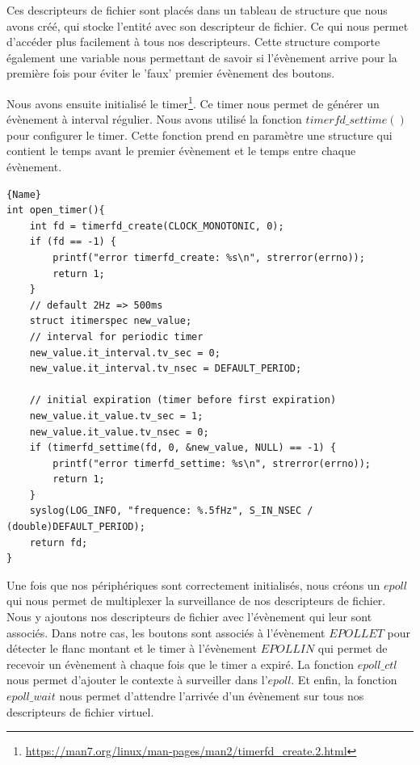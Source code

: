 \documentclass[
	a4paper, %
	10pt, %
]{CSUniSchoolLabReport}
\begin{document}
Ces descripteurs de fichier sont placés dans un tableau de structure que nous avons créé, qui stocke l'entité avec son descripteur de fichier. Ce qui nous permet d'accéder plus facilement à tous nos descripteurs. Cette structure comporte également une variable nous permettant de savoir si l'évènement arrive pour la première fois pour éviter le 'faux' premier évènement des boutons.

Nous avons ensuite initialisé le timer\footnote{\href{https://man7.org/linux/man-pages/man2/timerfd_create.2.html}{https://man7.org/linux/man-pages/man2/timerfd\_create.2.html}}. 
Ce timer nous permet de générer un évènement à interval régulier. Nous avons utilisé la fonction $timerfd\_settime()$ pour configurer le timer. Cette fonction prend en paramètre une structure qui contient le temps avant le premier évènement et le temps entre chaque évènement.
\newpage
\begin{lstlisting}[style=CStyle, caption=Initialisation du timer, firstnumber=1]{Name}
int open_timer(){
	int fd = timerfd_create(CLOCK_MONOTONIC, 0);
    if (fd == -1) {
        printf("error timerfd_create: %s\n", strerror(errno));
        return 1;
    }
    // default 2Hz => 500ms
    struct itimerspec new_value;
    // interval for periodic timer
    new_value.it_interval.tv_sec = 0;
    new_value.it_interval.tv_nsec = DEFAULT_PERIOD; 

    // initial expiration (timer before first expiration)
    new_value.it_value.tv_sec = 1;
    new_value.it_value.tv_nsec = 0;
    if (timerfd_settime(fd, 0, &new_value, NULL) == -1) {
        printf("error timerfd_settime: %s\n", strerror(errno));
        return 1;
    }
    syslog(LOG_INFO, "frequence: %.5fHz", S_IN_NSEC / (double)DEFAULT_PERIOD);
    return fd;
}
\end{lstlisting}

Une fois que nos périphériques sont correctement initialisés, nous créons un $epoll$ qui nous permet de multiplexer la surveillance de nos descripteurs de fichier. Nous y ajoutons nos descripteurs de fichier avec l'évènement qui leur sont associés. Dans notre cas, les boutons sont associés à l'évènement $EPOLLET$ pour détecter le flanc montant et le timer à l'évènement $EPOLLIN$ qui permet de recevoir un évènement à chaque fois que le timer a expiré. La fonction $epoll\_ctl$ nous permet d'ajouter le contexte à surveiller dans l'$epoll$. Et enfin, la fonction $epoll\_wait$ nous permet d'attendre l'arrivée d'un évènement sur tous nos descripteurs de fichier virtuel.
\end{document}
